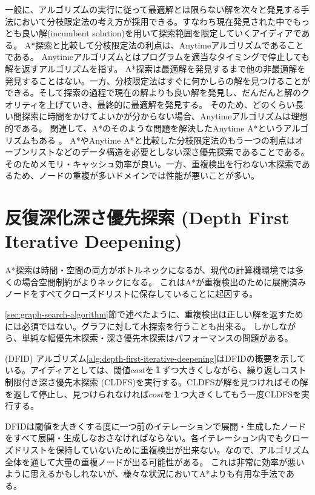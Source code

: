 一般に、アルゴリズムの実行に従って最適解とは限らない解を次々と発見する手法において分枝限定法の考え方が採用できる。すなわち現在発見された中でもっとも良い解(incumbent solution)を用いて探索範囲を限定していくアイディアである。
A*探索と比較して分枝限定法の利点は、Anytimeアルゴリズムであることである。
Anytimeアルゴリズムとはプログラムを適当なタイミングで停止しても解を返すアルゴリズムを指す。
A*探索は最適解を発見するまで他の非最適解を発見することはない。一方、分枝限定法はすぐに何かしらの解を見つけることができる。そして探索の過程で現在の解よりも良い解を発見し、だんだんと解のクオリティを上げていき、最終的に最適解を発見する。
そのため、どのくらい長い間探索に時間をかけてよいかが分からない場合、Anytimeアルゴリズムは理想的である。
関連して、A*のそのような問題を解決したAnytime A*というアルゴリズムもある \cite{}。
A*やAnytime A*と比較した分枝限定法のもう一つの利点はオープンリストなどのデータ構造を必要としない深さ優先探索であることである。そのためメモリ・キャッシュ効率が良い。一方、重複検出を行わない木探索であるため、ノードの重複が多いドメインでは性能が悪いことが多い。


\section{反復深化深さ優先探索 (Depth First Iterative Deepening)}
\label{sec:depth-first-iterative-deepening}
A*探索は時間・空間の両方がボトルネックになるが、現代の計算機環境では多くの場合空間制約がよりネックになる。
これはA*が重複検出のために展開済みノードをすべてクローズドリストに保存していることに起因する。

\ref{sec:graph-search-algorithm}節で述べたように、重複検出は正しい解を返すためには必須ではない。グラフに対して木探索を行うことも出来る。
しかしながら、単純な幅優先木探索・深さ優先木探索はパフォーマンスの問題がある。

 (DFID)
アルゴリズム\ref{alg:depth-first-iterative-deepening}はDFIDの概要を示している。アイディアとしては、閾値$cost$を１ずつ大きくしながら、繰り返しコスト制限付き深さ優先木探索 (CLDFS)を実行する。CLDFSが解を見つければその解を返して停止し、見つけられなければ$cost$を１つ大きくしてもう一度CLDFSを実行する。

DFIDは閾値を大きくする度に一つ前のイテレーションで展開・生成したノードをすべて展開・生成しなおさなければならない。各イテレーション内でもクローズドリストを保持していないために重複検出が出来ない。なので、アルゴリズム全体を通して大量の重複ノードが出る可能性がある。
これは非常に効率が悪いように思えるかもしれないが、様々な状況においてA*よりも有用な手法である。

